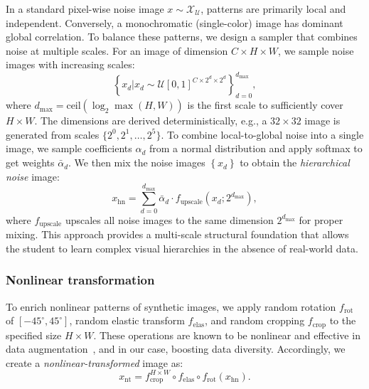 \begin{foldable} %
    In a standard pixel-wise noise image $x\sim\mathcal{X_{\mathcal{U}}}$, patterns are primarily local and independent.
    Conversely, a monochromatic (single-color) image has dominant global correlation.
    To balance these patterns, we design a sampler that combines noise at multiple scales.
    For an image of dimension $C \times H \times W$, we sample noise images with increasing scales:
    \begin{equation} \label{ch4:eq:synthesis-hiernoise-multiscale}
        \left\{ x_{d}|x_{d}\sim\mathcal{U}\left[0,1\right]^{C\times2^{d}\times2^{d}}\right\} _{d=0}^{d_{\text{max}}},
    \end{equation}
    where $d_{\text{max}}=\text{ceil}\left(\log_{2}\max\left(H,W\right)\right)$ is the first scale to sufficiently cover $H\times W$.
    The dimensions are derived deterministically, e.g., a $32 \times 32$ image is generated from scales $\{2^0, 2^1, \ldots, 2^5\}$.
    To combine local-to-global noise into a single image, we sample coefficients $\alpha_d$ from a normal distribution and apply softmax to get weights $\bar{\alpha}_{d}$.
    We then mix the noise images $\left\{ x_{d}\right\}$ to obtain the \textit{hierarchical noise} image:
    \begin{equation} \label{ch4:eq:synthesis-hiernoise-combine}
        x_{\text{hn}}=\sum_{d=0}^{d_{\text{max}}}\bar{\alpha}_{d}\cdot f_{\text{upscale}}\left(x_{d};2^{d_\text{max}}\right),
    \end{equation}
    where $f_{\text{upscale}}$ upscales all noise images to the same dimension $2^{d_\text{max}}$ for proper mixing.
    This approach provides a multi-scale structural foundation that allows the student to learn complex visual hierarchies in the absence of real-world data.
\end{foldable}


\subsubsection{Nonlinear transformation} \label{ch4:sssec:03-framework-synthesis-nonlintrans}
\begin{foldable} %
    To enrich nonlinear patterns of synthetic images, we apply random rotation $f_{\text{rot}}$ of $\left[-45^{\circ},45^{\circ}\right]$, random elastic transform $f_{\text{elas}}$, and random cropping $f_{\text{crop}}$ to the specified size $H\times W$.
    These operations are known to be nonlinear and effective in data augmentation~\cite{simard2003best}, and in our case, boosting data diversity.
    Accordingly, we create a \textit{nonlinear-transformed} image as:
    \begin{equation} \label{ch4:eq:synthesis-nonlintrans}
        x_{\text{nt}}=f_{\text{crop}}^{H\times W} \circ f_{\text{elas}} \circ f_{\text{rot}}\left(x_{\text{hn}}\right).
    \end{equation}
\end{foldable}




